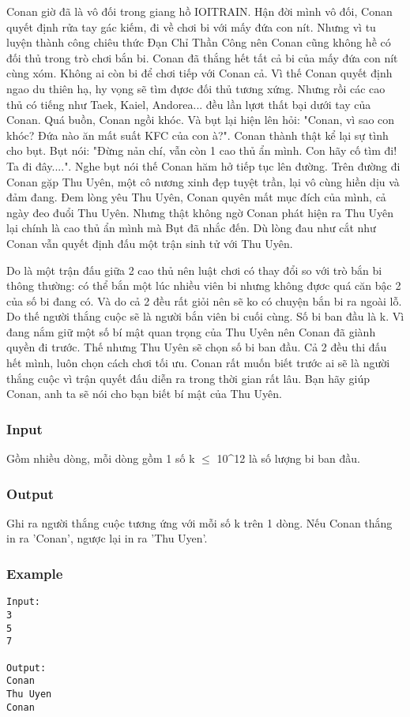 



   Conan giờ đã là vô đối trong giang hồ IOITRAIN. Hận đời mình vô đối, Conan quyết định rửa tay gác kiếm, đi về chơi bi với mấy đứa con nít. Nhưng vì tu luyện thành công chiêu thức Đạn Chỉ Thần Công nên Conan cũng không hề có đối thủ trong trò chơi bắn bi. Conan đã thắng hết tất cả bi của mấy đứa con nít cùng xóm. Không ai còn bi để chơi tiếp với Conan cả. Vì thế Conan quyết định ngao du thiên hạ, hy vọng sẽ tìm đựơc đối thủ tương xứng. Nhưng rồi các cao thủ có tiếng như Taek, Kaiel, Andorea... đều lần lựơt thất bại dưới tay của Conan. Quá buồn, Conan ngồi khóc. Và bụt lại hiện lên hỏi: "Conan, vì sao con khóc? Đứa nào ăn mất suất KFC của con à?". Conan thành thật kể lại sự tình cho bụt. Bụt nói: "Đừng nản chí, vẫn còn 1 cao thủ ẩn mình. Con hãy cố tìm đi! Ta đi đây....". Nghe bụt nói thế Conan hăm hở tiếp tục lên đường. Trên đường đi Conan gặp Thu Uyên, một cô nương xinh đẹp tuyệt trần, lại vô cùng hiền dịu và đảm đang. Đem lòng yêu Thu Uyên, Conan quyên mất mục đích của mình, cả ngày đeo đuổi Thu Uyên. Nhưng thật không ngờ Conan phát hiện ra Thu Uyên lại chính là cao thủ ẩn mình mà Bụt đã nhắc đến. Dù lòng đau như cắt như Conan vẫn quyết định đấu một trận sinh tử với Thu Uyên.  

   Do là một trận đấu giữa 2 cao thủ nên luật chơi có thay đổi so với trò bắn bi thông thường: có thể bắn một lúc nhiều viên bi nhưng không đựơc quá căn bậc 2 của số bi đang có. Và do cả 2 đều rất giỏi nên sẽ ko có chuyện bắn bi ra ngoài lỗ. Do thế người thắng cuộc sẽ là người bắn viên bi cuối cùng. Số bi ban đầu là k. Vì đang nắm giữ một số bí mật quan trọng của Thu Uyên nên Conan đã giành quyền đi trước. Thế nhưng Thu Uyên sẽ chọn số bi ban đầu. Cả 2 đều thi đấu hết mình, luôn chọn cách chơi tối ưu. Conan rất muốn biết trước ai sẽ là người thắng cuộc vì trận quyết đấu diễn ra trong thời gian rất lâu. Bạn hãy giúp Conan, anh ta sẽ nói cho bạn biết bí mật của Thu Uyên.  

\subsubsection{   Input  }

   Gồm nhiều dòng, mỗi dòng gồm 1 số k  $\le$  10^12 là số lượng bi ban đầu.  

\subsubsection{   Output  }

   Ghi ra người thắng cuộc tương ứng với mỗi số k trên 1 dòng. Nếu Conan thắng in ra 'Conan', ngược lại in ra 'Thu Uyen'.  

\subsubsection{   Example  }
\begin{verbatim}
Input:
3 
5
7

Output:
Conan
Thu Uyen
Conan
\end{verbatim}
